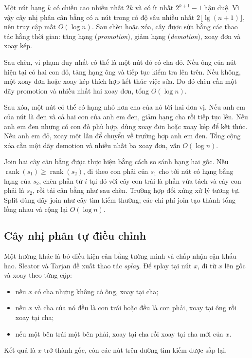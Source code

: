 \documentclass[11pt]{article}
\begin{document}
Một nút hạng \(k\) có chiều cao nhiều nhất \(2k\) và có ít nhất \(2^{k+1}-1\)
hậu duệ. Vì vậy cây nhị phân cân bằng có \(n\) nút trong có độ sâu nhiều nhất
\(2\lfloor\lg(n+1)\rfloor\), nên truy cập mất \(O(\log n)\). Sau chèn hoặc xóa,
cây được sửa bằng các thao tác hằng thời gian: tăng hạng (\emph{promotion}),
giảm hạng (\emph{demotion}), xoay đơn và xoay kép.

Sau chèn, vi phạm duy nhất có thể là một nút đỏ có cha đỏ. Nếu ông của nút hiện
tại có hai con đỏ, tăng hạng ông và tiếp tục kiểm tra lên trên. Nếu không, một
xoay đơn hoặc xoay kép thích hợp kết thúc việc sửa. Do đó chèn cần một dãy
promotion và nhiều nhất hai xoay đơn, tổng \(O(\log n)\).

Sau xóa, một nút có thể có hạng nhỏ hơn cha của nó tới hai đơn vị. Nếu anh em
của nút là đen và cả hai con của anh em đen, giảm hạng cha rồi tiếp tục lên.
Nếu anh em đen nhưng có con đỏ phù hợp, dùng xoay đơn hoặc xoay kép để kết
thúc. Nếu anh em đỏ, xoay một lần để chuyển về trường hợp anh em đen. Tổng cộng
xóa cần một dãy demotion và nhiều nhất ba xoay đơn, vẫn \(O(\log n)\).

Join hai cây cân bằng được thực hiện bằng cách so sánh hạng hai gốc. Nếu
\(\operatorname{rank}(s_1)\ge \operatorname{rank}(s_2)\), đi theo con phải của
\(s_1\) cho tới nút có hạng bằng hạng của \(s_2\), chèn phần tử \(i\) tại đó với
cây con trái là phần vừa tách và cây con phải là \(s_2\), rồi tái cân bằng như
sau chèn. Trường hợp đối xứng xử lý tương tự. Split dùng dãy join như cây tìm
kiếm thường; các chi phí join tạo thành tổng lồng nhau và cộng lại \(O(\log n)\).

\subsection*{Cây nhị phân tự điều chỉnh}

Một hướng khác là bỏ điều kiện cân bằng tường minh và chấp nhận cận khấu hao.
Sleator và Tarjan đề xuất thao tác \emph{splay}. Để splay tại nút \(x\), đi từ
\(x\) lên gốc và xoay theo từng cặp:
\begin{itemize}
  \item nếu \(x\) có cha nhưng không có ông, xoay tại cha;
  \item nếu \(x\) và cha của nó đều là con trái hoặc đều là con phải, xoay tại
        ông rồi xoay tại cha;
  \item nếu một bên trái một bên phải, xoay tại cha rồi xoay tại cha mới của
        \(x\).
\end{itemize}
Kết quả là \(x\) trở thành gốc, còn các nút trên đường tìm kiếm được sắp lại.
\end{document}
